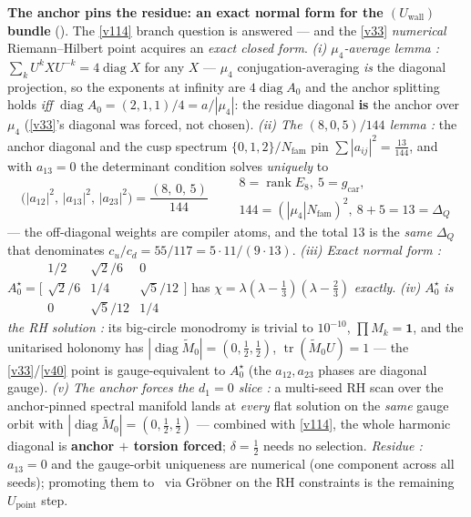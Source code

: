 \documentclass[11pt,a4paper]{article}
\newcommand{\Nfam}{N_{\mathrm{fam}}}
\newcommand{\gcar}{g_{\mathrm{car}}}
\begin{document}
\par\smallskip\noindent\textbf{The anchor pins the residue: an exact normal form for the $(U_{\mathrm{wall}})$ bundle} (\mE).
The \vref{v114} branch question is answered --- and the \vref{v33} \emph{numerical} Riemann--Hilbert point acquires an
\emph{exact closed form}. \emph{(i) $\mu_4$-average lemma \mE:} $\sum_kU^kXU^{-k}=4\operatorname{diag}X$
for any $X$ --- $\mu_4$ conjugation-averaging \emph{is} the diagonal projection, so the exponents at
infinity are $4\operatorname{diag}A_0$ and the anchor splitting holds \emph{iff}
$\operatorname{diag}A_0=(2,1,1)/4=a/|\mu_4|$: the residue diagonal \textbf{is} the anchor over $\mu_4$
(\vref{v33}'s diagonal was forced, not chosen). \emph{(ii) The $(8,0,5)/144$ lemma \mE:} the anchor diagonal
and the cusp spectrum $\{0,1,2\}/\Nfam$ pin $\sum|a_{ij}|^2=\tfrac{13}{144}$, and with $a_{13}=0$ the
determinant condition solves \emph{uniquely} to
\[
  \boxed{\ \bigl(|a_{12}|^2,\,|a_{13}|^2,\,|a_{23}|^2\bigr)=\frac{(8,\,0,\,5)}{144}\ }
  \quad\begin{aligned}
  &\scriptstyle 8=\operatorname{rank}E_8,\ 5=\gcar,\\[-2pt]
  &\scriptstyle 144=(|\mu_4|\Nfam)^2,\ 8+5=13=\Delta_Q
  \end{aligned}
\]
--- the off-diagonal weights are compiler atoms, and the total $13$ is the \emph{same} $\Delta_Q$ that
denominates $c_u/c_d=55/117=5\cdot11/(9\cdot13)$. \emph{(iii) Exact normal form \mE:}
$A_0^\star=\bigl[\begin{smallmatrix}1/2&\sqrt2/6&0\\\sqrt2/6&1/4&\sqrt5/12\\0&\sqrt5/12&1/4\end{smallmatrix}\bigr]$
has $\chi=\lambda(\lambda-\tfrac13)(\lambda-\tfrac23)$ \emph{exactly}. \emph{(iv) $A_0^\star$ is the RH
solution \mE:} its big-circle monodromy is trivial to $10^{-10}$, $\prod M_k=\mathbf1$, and the
unitarised holonomy has $|\operatorname{diag}\widetilde M_0|=(0,\tfrac12,\tfrac12)$,
$\operatorname{tr}(\widetilde M_0U)=1$ --- the \vref{v33}/\vref{v40} point is gauge-equivalent to $A_0^\star$ (the
$a_{12},a_{23}$ phases are diagonal gauge). \emph{(v) The anchor forces the $d_1=0$ slice \mE:} a
multi-seed RH scan over the anchor-pinned spectral manifold lands at \emph{every} flat solution on the
\emph{same} gauge orbit with $|\operatorname{diag}\widetilde M_0|=(0,\tfrac12,\tfrac12)$ --- combined
with \vref{v114}, the whole harmonic diagonal is \textbf{anchor $+$ torsion forced}; $\delta=\tfrac12$ needs no
selection. \emph{Residue \mC:} $a_{13}=0$ and the gauge-orbit uniqueness are numerical (one component
across all seeds); promoting them to \mE\ via Gr\"obner on the RH constraints is the remaining
$U_{\mathrm{point}}$ step. 
\end{document}

